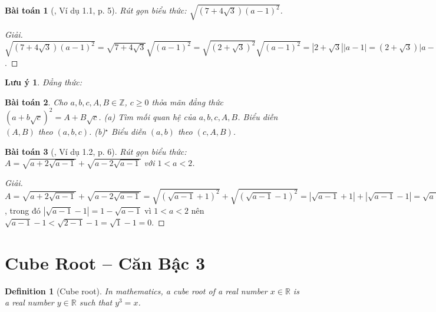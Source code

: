 \documentclass{article}
\newtheorem{baitoan}{Bài toán}
\newtheorem{definition}{Definition}
\newtheorem{luuy}{Lưu ý}
\begin{document}
\begin{baitoan}[\cite{TLCT_THCS_Toan_9_dai_so}, Ví dụ 1.1, p. 5]
	Rút gọn biểu thức: $\sqrt{(7 + 4\sqrt{3})(a - 1)^2}$.
\end{baitoan}

\begin{proof}[Giải]
	$\sqrt{(7 + 4\sqrt{3})(a - 1)^2} = \sqrt{7 + 4\sqrt{3}}\sqrt{(a - 1)^2} = \sqrt{(2 + \sqrt{3})^2}\sqrt{(a - 1)^2} = |2 + \sqrt{3}||a - 1| = (2 + \sqrt{3})|a - 1|$.
\end{proof}

\begin{luuy}
	Đẳng thức: 
\end{luuy}

\begin{baitoan}
	Cho $a,b,c,A,B\in\mathbb{Z}$, $c\ge0$ thỏa mãn đẳng thức $(a + b\sqrt{c})^2 = A + B\sqrt{c}$. (a) Tìm mối quan hệ của $a,b,c,A,B$. Biểu diễn $(A,B)$ theo $(a,b,c)$. (b)${}^\star$ Biểu diễn $(a,b)$ theo $(c,A,B)$.
\end{baitoan}

\begin{baitoan}[\cite{TLCT_THCS_Toan_9_dai_so}, Ví dụ 1.2, p. 6]
	Rút gọn biểu thức: $A = \sqrt{a + 2\sqrt{a - 1}} + \sqrt{a - 2\sqrt{a - 1}}$ với $1 < a < 2$.
\end{baitoan}

\begin{proof}[Giải]
	$A = \sqrt{a + 2\sqrt{a - 1}} + \sqrt{a - 2\sqrt{a - 1}} = \sqrt{(\sqrt{a - 1} + 1)^2} + \sqrt{(\sqrt{a - 1} - 1)^2} = |\sqrt{a - 1} + 1| + |\sqrt{a - 1} - 1| = \sqrt{a - 1} + 1 + + 1 - \sqrt{a - 1} = 2$, trong đó $|\sqrt{a - 1} - 1| = 1 - \sqrt{a - 1}$ vì $1 < a < 2$ nên $\sqrt{a - 1} - 1 < \sqrt{2 - 1} - 1 = \sqrt{1} - 1 = 0$.
\end{proof}



\section{Cube Root -- Căn Bậc 3}

\begin{definition}[Cube root]
	In mathematics, a \emph{cube root} of a real number $x\in\mathbb{R}$ is a real number $y\in\mathbb{R}$ such that $y^3 = x$.
\end{definition}
\end{document}

